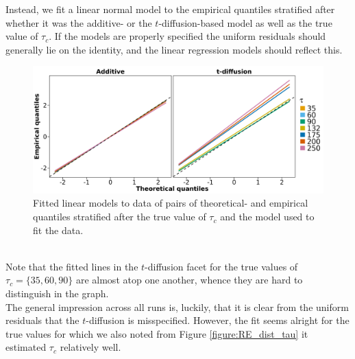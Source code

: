 Instead, we fit a linear normal model to the empirical quantiles stratified after whether it was the additive- or the $t$-diffusion-based model as well as the true value of $\tau_c$. If the models are properly specified the uniform residuals should generally lie on the identity, and the linear regression models should reflect this.
\begin{figure}[h!]
    \begin{center}
        \includegraphics[scale = .075]{figures/quantiles_plot_tau.jpeg}
        \caption{Fitted linear models to data of pairs of theoretical- and empirical quantiles stratified after the true value of $\tau_c$ and the model used to fit the data.}
        \label{figure:QQ_plot_tau}
    \end{center}
\end{figure}\\
Note that the fitted lines in the $t$-diffusion facet for the true values of $\tau_c = \{35, 60, 90\}$ are almost atop one another, whence they are hard to distinguish in the graph. \\
The general impression across all runs is, luckily, that it is clear from the uniform residuals that the $t$-diffusion is misspecified. However, the fit seems alright for the true values for which we also noted from Figure \ref{figure:RE_dist_tau} it estimated $\tau_c$ relatively well. 